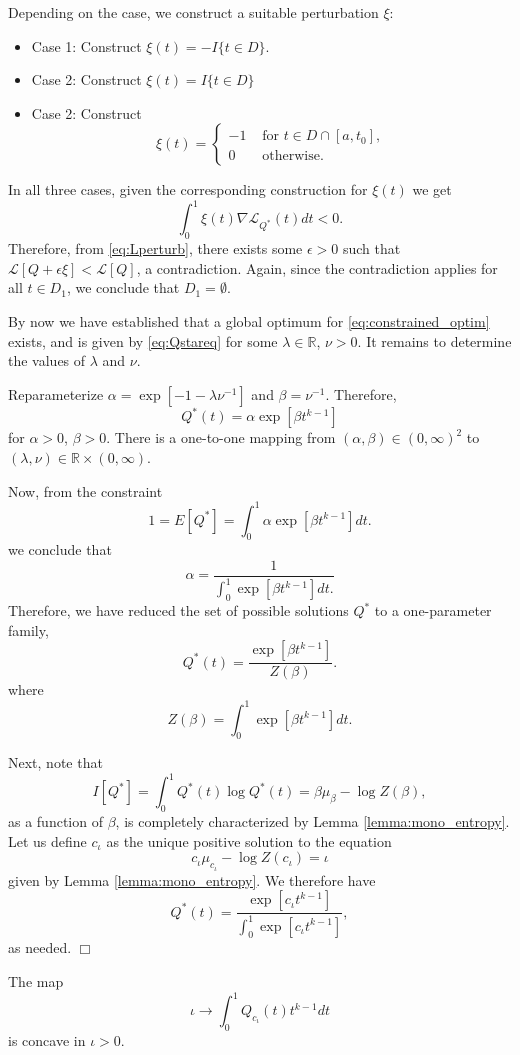 \documentclass[12pt]{article}
\begin{document}
Depending on the case, we construct a suitable perturbation $\xi$:
\begin{itemize}
\item Case 1: Construct $\xi(t) = -I\{t \in D\}$.
\item Case 2: Construct $\xi(t) = I\{t \in D\}$
\item Case 2: Construct
\[
\xi(t) = \begin{cases}
-1 & \text{ for }t \in D \cap [a, t_0],\\
0 & \text{ otherwise. }
\end{cases}
\]
\end{itemize}
In all three cases, given the corresponding construction for $\xi(t)$ we get
\[
\int_0^1 \xi(t) \nabla \mathcal{L}_{Q^*}(t) dt < 0.
\]
Therefore, from \eqref{eq:Lperturb}, there exists some $\epsilon > 0$
such that $\mathcal{L}[Q + \epsilon \xi] < \mathcal{L}[Q]$, a
contradiction.  Again, since the contradiction applies for all $t \in
D_1$, we conclude that $D_1 = \emptyset$.

By now we have established that a global optimum
for \eqref{eq:constrained_optim} exists, and is given
by \eqref{eq:Qstareq} for some $\lambda \in \mathbb{R}$, $\nu > 0$.  It remains
to determine the values of $\lambda$ and $\nu$.

Reparameterize $\alpha = \exp[-1-\lambda\nu^{-1}]$ and $\beta = \nu^{-1}$.
Therefore,
\[
Q^*(t) = \alpha \exp[\beta t^{k-1}]
\]
for $\alpha > 0$, $\beta > 0$.  There is a one-to-one mapping from
$(\alpha, \beta) \in (0, \infty)^2$ to $(\lambda, \nu) \in
\mathbb{R} \times (0,\infty)$.

Now, from the constraint
\[
1 = E[Q^*] = \int_0^1 \alpha \exp[\beta t^{k-1}] dt.
\]
we conclude that
\[
\alpha = \frac{1}{\int_0^1 \exp[\beta t^{k-1}] dt.}
\]
Therefore, we have reduced the set of possible solutions $Q^*$ to a one-parameter family,
\[
Q^*(t) = \frac{\exp[\beta t^{k-1}]}{Z(\beta)}.
\]
where
\[
Z(\beta) = \int_0^1 \exp[\beta t^{k-1}] dt.
\]

Next, note that
\[
I[Q^*] = \int_0^1 Q^*(t) \log Q^*(t) = \beta \mu_\beta - \log Z(\beta),
\]
as a function of $\beta$, is completely characterized by Lemma \ref{lemma:mono_entropy}.
Let us define $c_\iota$ as the unique positive solution to the equation
\[
c_\iota \mu_{c_\iota} - \log Z(c_\iota) = \iota
\]
given by Lemma \ref{lemma:mono_entropy}.
We therefore have
\[
Q^*(t) = \frac{\exp[c_\iota t^{k-1}]}{\int_0^1 \exp[c_\iota t^{k-1}]},
\]
as needed. $\Box$


\begin{lemma}\label{lemma:concave}
The map
\[
\iota \to \int_0^1 Q_{c_\iota}(t) t^{k-1} dt
\]
is concave in $\iota > 0$.
\end{lemma}
\end{document}
